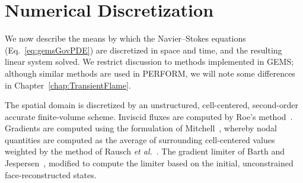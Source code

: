 \section{Numerical Discretization}\label{sec:numerics}

We now describe the means by which the Navier--Stokes equations (Eq.~\ref{eq:gemsGovPDE}) are discretized in space and time, and the resulting linear system solved. We restrict discussion to methods implemented in GEMS; although similar methods are used in PERFORM, we will note some differences in Chapter~\ref{chap:TransientFlame}.

The spatial domain is discretized by an unstructured, cell-centered, second-order accurate finite-volume scheme. Inviscid fluxes are computed by Roe's method~\cite{Roe1981}. Gradients are computed using the formulation of Mitchell~\cite{Mitchell1994}, whereby nodal quantities are computed as the average of surrounding cell-centered values weighted by the method of Rausch \textit{et al.}~\cite{Rausch1991}. The gradient limiter of Barth and Jespersen~\cite{Barth1989}, modified to compute the limiter based on the initial, unconstrained face-reconstructed states.

